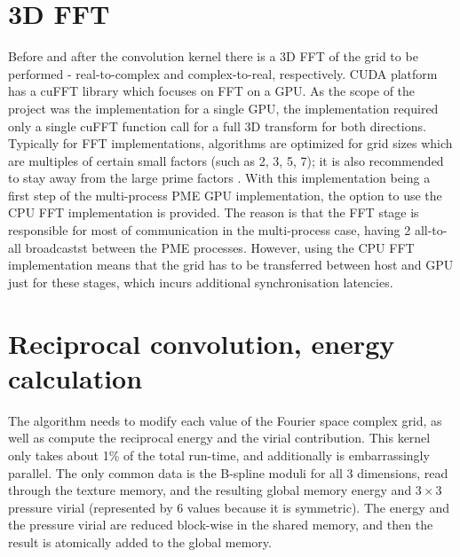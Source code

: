 \documentclass[12pt,a4paper]{report}
\newcommand{\draft}[1]{#1}
\begin{document}
\section{3D FFT} \label{FFTimpl}

Before and after the convolution kernel there is a 3D FFT of the grid to be performed - real-to-complex and complex-to-real, respectively. 
CUDA platform has a cuFFT library which focuses on FFT on a GPU. 
As the scope of the project was the implementation for a single GPU, the implementation required only a single cuFFT function call for a full 3D transform for both directions. 
Typically for FFT implementations, algorithms are optimized for grid sizes which are multiples of certain small factors (such as 2, 3, 5, 7); it is also recommended to stay away from the large prime factors \cite{cufft}.
With this implementation being a first step of the multi-process PME GPU implementation, the option to use the CPU FFT implementation is provided. The reason is that the FFT stage is responsible for most of communication in the multi-process case, having 2 all-to-all broadcastst between the PME processes. However, using the CPU FFT implementation means that the grid has to be transferred between host and GPU just for these stages, which incurs additional synchronisation latencies.

\section{Reciprocal convolution, energy calculation}


The algorithm needs to modify each value of the Fourier space complex grid, as well as compute the reciprocal energy and the virial contribution. This kernel only takes about \draft{1\%} of the total run-time, and additionally is embarrassingly parallel. The only common data is the B-spline moduli for all 3 dimensions, read through the texture memory, and the resulting global memory energy and $3 \times 3$ pressure virial (represented by 6 values because it is symmetric). The energy and the pressure virial are reduced block-wise in the shared memory, and then the result is atomically added to the global memory.
\end{document}
